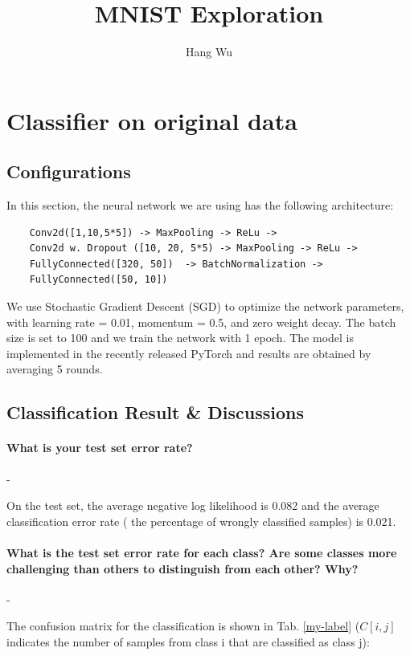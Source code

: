 \documentclass[11pt]{article}
\begin{document}
\title{MNIST Exploration}
\author{Hang Wu}
\maketitle

\section{Classifier on original data}

\subsection{Configurations}
In this section, the neural network we are using has the following architecture:
\begin{verbatim}
    Conv2d([1,10,5*5]) -> MaxPooling -> ReLu ->
    Conv2d w. Dropout ([10, 20, 5*5) -> MaxPooling -> ReLu ->
    FullyConnected([320, 50])  -> BatchNormalization -> 
    FullyConnected([50, 10])
\end{verbatim}

We use Stochastic Gradient Descent (SGD) to optimize  the network parameters, with learning rate = 0.01, momentum = 0.5, and zero weight decay. The batch size is set to 100 and we train the network with 1 epoch. The model is implemented in the recently released PyTorch and results are obtained by averaging 5 rounds.

\subsection{Classification Result \& Discussions}
\paragraph{What is your test set error rate?} -

On the test set, the average negative log likelihood is 0.082 and the average classification error rate ( the percentage of wrongly classified samples) is 0.021.

\paragraph{What is the test set error rate for each class? Are some classes more challenging than others to distinguish from each other? Why?} -

The confusion matrix for the classification is shown in Tab. \ref{my-label} ($C[i,j]$ indicates the number of samples from class i that are classified as class j):
\end{document}
